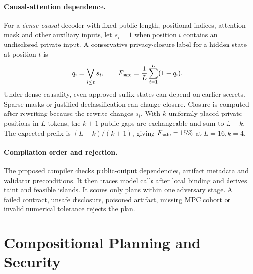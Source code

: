 \documentclass[runningheads]{llncs}
\begin{document}
\paragraph{Causal-attention dependence.}
For a \emph{dense causal} decoder with fixed public length, positional
indices, attention mask and other auxiliary inputs, let $s_i=1$ when
position $i$ contains an undisclosed private input. A conservative
privacy-closure label for a hidden state at position $t$ is
\begin{equation}\label{eq:prefix}
  q_t=\bigvee_{i\leq t}s_i,\qquad
  F_{\rm safe}=\frac{1}{L}\sum_{t=1}^{L}(1-q_t).
\end{equation}
Under dense causality, even approved suffix states can depend on earlier
secrets. Sparse masks or justified declassification can change closure.
Closure is computed after rewriting because the rewrite changes $s_i$.
With $k$ uniformly placed private positions in $L$ tokens, the
$k+1$ public gaps are exchangeable and sum to $L-k$. The expected prefix
is $(L-k)/(k+1)$, giving $F_{\rm safe}=15\%$ at $L=16,k=4$.

\paragraph{Compilation order and rejection.}
The proposed compiler checks public-output dependencies, artifact metadata and
validator preconditions. It then traces model calls after local binding
and derives taint and feasible islands. It scores only plans within one
adversary stage. A failed contract, unsafe disclosure, poisoned artifact,
missing MPC cohort or invalid numerical tolerance rejects the plan.

\section{Compositional Planning and Security}
\end{document}
